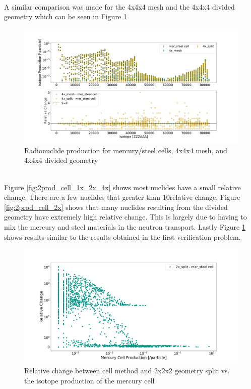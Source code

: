 %
\\
A similar comparison was made for the 4x4x4 mesh and the 4x4x4 divided geometry
which can be seen in Figure \ref{fig:2prod_cell_4x}
%
\begin{figure}[h!]
 \centering
 \includegraphics[scale=0.42,trim={3cm 1cm 3cm 3cm},clip]{../figs/toy_p2/prod_VPII_4x.pdf}
 \caption{Radionuclide production for mercury/steel cells, 4x4x4 mesh, and 4x4x4 divided geometry}
 \label{fig:2prod_cell_4x}
\end{figure}
%
\\
Figure \ref{fig:2prod_cell_1x_2x_4x} shows most nuclides have a small relative
change. There are a few nuclides that greater than 10\percent relative change.
Figure \ref{fig:2prod_cell_2x} shows that many nuclides resulting from the
divided geometry have extremely high relative change. This is largely due to
having to mix the mercury and steel materials in the neutron transport. Lastly
Figure \ref{fig:2prod_cell_4x} shows results similar to the results obtained in
the first verification problem.
%
\begin{figure}[h!]
 \centering
 \includegraphics[scale=0.42,trim={3cm 0.5cm 3cm 3cm},clip]{../figs/toy_p2/prod_VPII_rc_2x_split.pdf}
 \caption{Relative change between cell method and 2x2x2 geometry split vs. the isotope production of the mercury cell}
 \label{fig:2prod_cell_2x_rc}
\end{figure}
